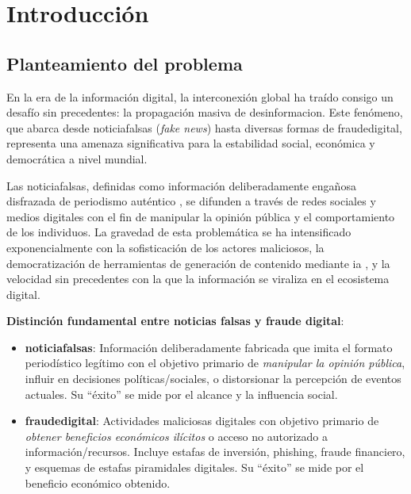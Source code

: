 \chapter{Introducción \label{cap:Introduccion}}

\section{Planteamiento del problema}

En la era de la información digital, la interconexión global ha traído consigo un desafío sin precedentes: la propagación masiva de \gls{desinformacion}. Este fenómeno, que abarca desde \glspl{noticiafalsa} (\textit{fake news}) hasta diversas formas de \gls{fraudedigital}, representa una amenaza significativa para la estabilidad social, económica y democrática a nivel mundial.

Las \glspl{noticiafalsa}, definidas como información deliberadamente engañosa disfrazada de periodismo auténtico \cite{bondielli2019survey}, se difunden a través de redes sociales y medios digitales con el fin de manipular la opinión pública y el comportamiento de los individuos. La gravedad de esta problemática se ha intensificado exponencialmente con la sofisticación de los actores maliciosos, la democratización de herramientas de generación de contenido mediante \gls{ia} \cite{hu2024bad}, y la velocidad sin precedentes con la que la información se viraliza en el ecosistema digital.

\textbf{Distinción fundamental entre noticias falsas y fraude digital}: 

\begin{itemize}
    \item \textbf{\Glspl{noticiafalsa}}: Información deliberadamente fabricada que imita el formato periodístico legítimo con el objetivo primario de \textit{manipular la opinión pública}, influir en decisiones políticas/sociales, o distorsionar la percepción de eventos actuales. Su ``éxito'' se mide por el alcance y la influencia social.
    
    \item \textbf{\Gls{fraudedigital}}: Actividades maliciosas digitales con objetivo primario de \textit{obtener beneficios económicos ilícitos} o acceso no autorizado a información/recursos. Incluye estafas de inversión, phishing, fraude financiero, y esquemas de estafas piramidales digitales. Su ``éxito'' se mide por el beneficio económico obtenido.
\end{itemize}

